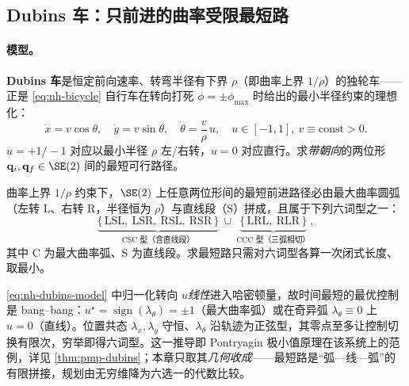\subsection{Dubins 车：只前进的曲率受限最短路}
\label{sec:nh-dubins}

\paragraph{模型。}
\textbf{Dubins 车}\cite{dubins1957curves}是恒定前向速率、转弯半径有下界 $\rho$（即曲率上界 $1/\rho$）的独轮车——正是 \cref{eq:nh-bicycle} 自行车在转向打死 $\phi=\pm\phi_{\max}$ 时给出的最小半径约束的理想化：
\begin{equation}
  \dot x=v\cos\theta,\quad \dot y=v\sin\theta,\quad \dot\theta=\frac{v}{\rho}\,u,\quad u\in[-1,1],\ v\equiv\text{const}>0 .
  \label{eq:nh-dubins-model}
\end{equation}
$u=+1/-1$ 对应以最小半径 $\rho$ 左/右转，$u=0$ 对应直行。求\emph{带朝向}的两位形 $\mathbf{q}_i,\mathbf{q}_f\in\SE(2)$ 间的最短可行路径。

\begin{theorem}\label{thm:nh-dubins}
曲率上界 $1/\rho$ 约束下，$\SE(2)$ 上任意两位形间的最短前进路径必由最大曲率圆弧（左转 $\mathrm{L}$、右转 $\mathrm{R}$，半径恒为 $\rho$）与直线段（$\mathrm{S}$）拼成，且属于下列六词型之一：
\begin{equation}
  \underbrace{\{\,\mathrm{LSL},\ \mathrm{LSR},\ \mathrm{RSL},\ \mathrm{RSR}\,\}}_{\text{CSC 型（含直线段）}}\ \cup\
  \underbrace{\{\,\mathrm{LRL},\ \mathrm{RLR}\,\}}_{\text{CCC 型（三弧相切）}},
  \label{eq:nh-dubins-words}
\end{equation}
其中 C 为最大曲率弧、S 为直线段。求最短路只需对六词型各算一次闭式长度、取最小。
\end{theorem}

\begin{insight}\label{ins:nh-dubins-why}
\cref{eq:nh-dubins-model} 中归一化转向 $u$\emph{线性}进入哈密顿量，故时间最短的最优控制是 bang--bang：$u^\star=\operatorname{sign}(\lambda_\theta)=\pm1$（最大曲率弧）或在奇异弧 $\lambda_\theta\equiv0$ 上 $u=0$（直线）。位置共态 $\lambda_x,\lambda_y$ 守恒、$\lambda_\theta$ 沿轨迹为正弦型，其零点至多让控制切换有限次，穷举即得六词型。这一推导即 Pontryagin 极小值原理在该系统上的范例，详见 \cref{thm:pmp-dubins}；本章只取其\emph{几何收成}——最短路是“弧—线—弧”的有限拼接，规划由无穷维降为六选一的代数比较。
\end{insight}

